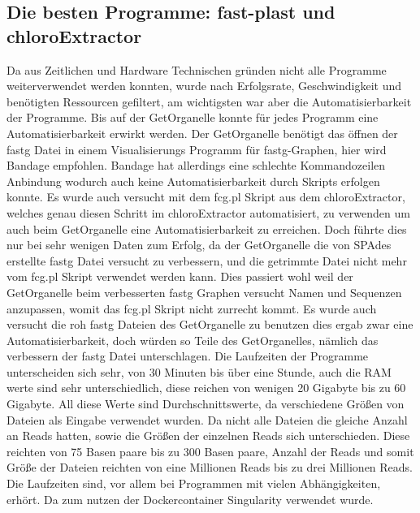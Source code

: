 \documentclass{scrartcl}
\begin{document}
\subsection{Die besten Programme: fast-plast und chloroExtractor}
\label{sec-4-5}
Da aus Zeitlichen und Hardware Technischen gründen nicht alle Programme weiterverwendet werden konnten, wurde nach Erfolgsrate, Geschwindigkeit und benötigten Ressourcen
gefiltert, am wichtigsten war aber die Automatisierbarkeit der Programme. Bis auf der GetOrganelle konnte für jedes Programm eine Automatisierbarkeit
erwirkt werden. Der GetOrganelle benötigt das öffnen der fastg Datei in einem Visualisierungs Programm für fastg-Graphen, hier wird Bandage empfohlen.
Bandage hat allerdings eine schlechte Kommandozeilen Anbindung wodurch auch keine Automatisierbarkeit durch Skripts erfolgen konnte.
Es wurde auch versucht mit dem fcg.pl Skript aus dem chloroExtractor, welches genau diesen Schritt im chloroExtractor automatisiert, zu verwenden um auch beim
GetOrganelle eine Automatisierbarkeit zu erreichen. Doch führte dies nur bei sehr wenigen Daten zum Erfolg, da der GetOrganelle die von SPAdes erstellte 
fastg Datei versucht zu verbessern, und die getrimmte Datei nicht mehr vom fcg.pl Skript verwendet werden kann. Dies passiert wohl weil der GetOrganelle beim verbesserten
fastg Graphen versucht Namen und Sequenzen anzupassen, womit das fcg.pl Skript nicht zurrecht kommt. Es wurde auch versucht die roh fastg Dateien des GetOrganelle zu benutzen
dies ergab zwar eine Automatisierbarkeit, doch würden so Teile des GetOrganelles, nämlich das verbessern der fastg Datei unterschlagen.
Die Laufzeiten der Programme unterscheiden sich sehr, von 30 Minuten bis über eine Stunde, auch die RAM werte sind sehr unterschiedlich, diese
reichen von wenigen 20 Gigabyte bis zu 60 Gigabyte. All diese Werte sind Durchschnittswerte, da verschiedene Größen von Dateien als Eingabe verwendet wurden. Da nicht alle
Dateien die gleiche Anzahl an Reads hatten, sowie die Größen der einzelnen Reads sich unterschieden. Diese reichten von 75 Basen paare bis zu 300 Basen paare, Anzahl der Reads
und somit Größe der Dateien reichten von eine Millionen Reads bis zu drei Millionen Reads. Die Laufzeiten sind, vor allem bei Programmen mit vielen Abhängigkeiten, erhört. Da zum nutzen
der Dockercontainer Singularity \footnotemark[43]{} verwendet wurde.    
\end{document}
